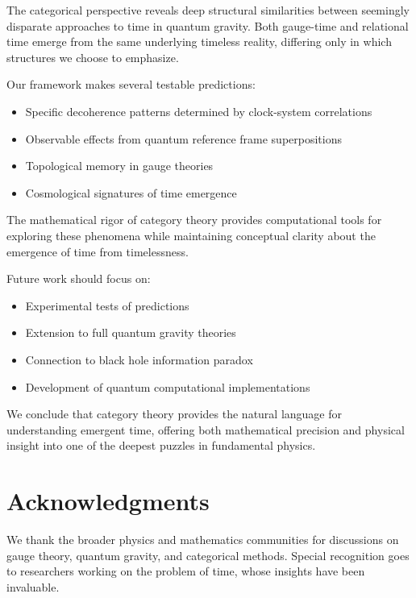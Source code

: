 \documentclass[12pt,a4paper]{article}
\begin{document}
The categorical perspective reveals deep structural similarities between seemingly disparate approaches to time in quantum gravity. Both gauge-time and relational time emerge from the same underlying timeless reality, differing only in which structures we choose to emphasize.

Our framework makes several testable predictions:
\begin{itemize}
\item Specific decoherence patterns determined by clock-system correlations
\item Observable effects from quantum reference frame superpositions
\item Topological memory in gauge theories
\item Cosmological signatures of time emergence
\end{itemize}

The mathematical rigor of category theory provides computational tools for exploring these phenomena while maintaining conceptual clarity about the emergence of time from timelessness.

Future work should focus on:
\begin{itemize}
\item Experimental tests of predictions
\item Extension to full quantum gravity theories
\item Connection to black hole information paradox
\item Development of quantum computational implementations
\end{itemize}

We conclude that category theory provides the natural language for understanding emergent time, offering both mathematical precision and physical insight into one of the deepest puzzles in fundamental physics.

\section*{Acknowledgments}

We thank the broader physics and mathematics communities for discussions on gauge theory, quantum gravity, and categorical methods. Special recognition goes to researchers working on the problem of time, whose insights have been invaluable.
\end{document}
